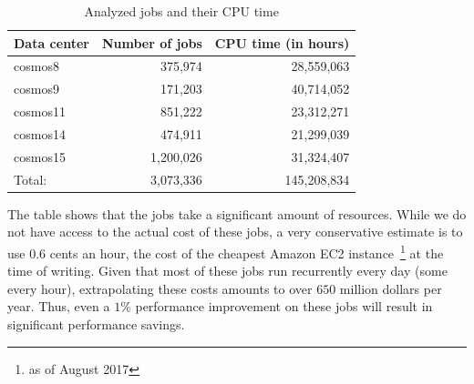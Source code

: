 \begin{table}[ht]
\centering
\begin{tabular}{lrr}
  Data center & Number of jobs & CPU time (in hours) \\
 \midrule
cosmos8 & 375,974 & 28,559,063 \\
cosmos9 & 171,203 & 40,714,052 \\
cosmos11 & 851,222 & 23,312,271\\
cosmos14 & 474,911 & 21,299,039\\
cosmos15 & 1,200,026 & 31,324,407 \\
\midrule
Total: & 3,073,336 & 145,208,834\\
\midrule
\end{tabular}
\caption{Analyzed jobs and their CPU time}\label{tb:projects}
\end{table}

The table shows that the jobs take a significant amount of resources. 
While we do not have access to the actual cost of these jobs, a very conservative estimate is to use $0.6$ cents an hour, the cost of the cheapest Amazon EC2 instance~\footnote{as of August 2017} at the time of writing. 
Given that most of these jobs run recurrently every day (some every hour), extrapolating these costs amounts to over $650$ million dollars per year. 
Thus, even a $1$\% performance improvement on these jobs will result in significant performance savings. 



